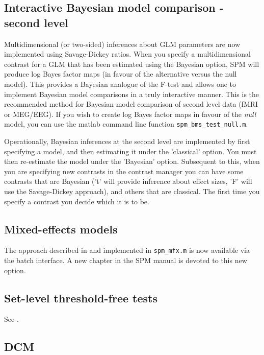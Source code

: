\documentclass[a4paper,titlepage,openany]{article}
\begin{document}
\begin{multicols}{2}
\subsection{Interactive Bayesian model comparison - second level}

Multidimensional (or two-sided) inferences about GLM parameters  are now implemented using Savage-Dickey ratios.  When you specify a multidimensional contrast for a GLM that has been estimated using the Bayesian option, SPM will produce log Bayes factor maps (in favour of the alternative versus the null model). This provides a Bayesian analogue of the F-test and allows one to implement Bayesian model comparisons in a truly interactive manner.
This is the recommended method for Bayesian model comparison of second level data (fMRI or MEG/EEG). If you wish to create log Bayes factor maps in favour of the {\em null} model, you can use the matlab command line function \verb!spm_bms_test_null.m!.

Operationally, Bayesian inferences at the second level are implemented by first specifying a model, and then estimating it under the 'classical' option. You must then re-estimate the model under the 'Bayesian' option. Subsequent to this, when you are specifying new contrasts in the contrast manager you can have some contrasts that are Bayesian ('t' will provide inference about effect sizes, 'F' will use the Savage-Dickey approach), and others that are classical. The first time you specify a contrast you decide which it is to be.



\subsection{Mixed-effects models}

The approach described in \cite{karl_mixed} and implemented in \texttt{spm\_mfx.m} is now available via the batch interface. A new chapter in the SPM manual is devoted to this new option.

\subsection{Set-level threshold-free tests}

See \cite{Barnes2013}.

\subsection{DCM}


\end{multicols}
\end{document}
